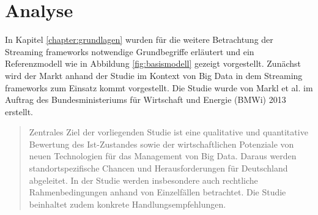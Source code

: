 \chapter{Analyse}
\label{chapter:analyse}

In Kapitel \ref{chapter:grundlagen} wurden für die weitere Betrachtung der Streaming frameworks notwendige Grundbegriffe erläutert und ein Referenzmodell wie in Abbildung \ref{fig:basismodell} gezeigt vorgestellt. Zunächst wird der Markt anhand der Studie  im Kontext von Big Data in dem Streaming frameworks zum Einsatz kommt vorgestellt. Die Studie  wurde von Markl et al. im Auftrag des Bundesministeriums für Wirtschaft und Energie (BMWi) 2013 erstellt. 

\begin{quote}
Zentrales Ziel der vorliegenden Studie ist eine qualitative und quantitative Bewertung des Ist-Zustandes sowie der wirtschaftlichen Potenziale von neuen Technologien für das Management von Big Data. Daraus werden standortspezifische Chancen und Herausforderungen für Deutschland abgeleitet. In der Studie werden insbesondere auch rechtliche Rahmenbedingungen anhand von Einzelfällen betrachtet. Die Studie beinhaltet zudem konkrete Handlungsempfehlungen. 
\end{quote}

